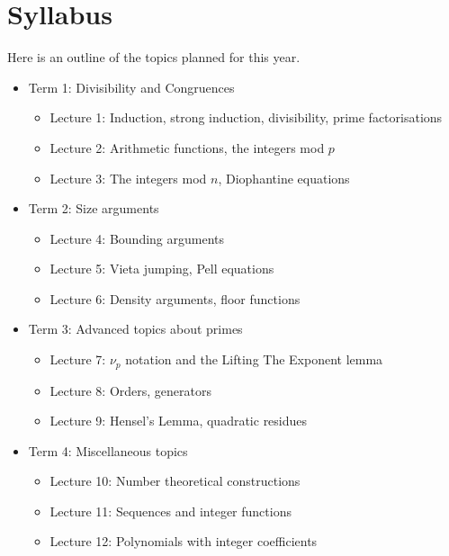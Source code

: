 \documentclass{article}
\begin{document}
\section{Syllabus}
Here is an outline of the topics planned for this year.
\begin{itemize}
  \item Term 1: Divisibility and Congruences
    \begin{itemize}
      \item Lecture 1: Induction, strong induction, divisibility, prime
        factorisations
      \item Lecture 2: Arithmetic functions, the integers mod $p$
      \item Lecture 3: The integers mod $n$, Diophantine equations
    \end{itemize}
  \item Term 2: Size arguments
    \begin{itemize}
      \item Lecture 4: Bounding arguments
      \item Lecture 5: Vieta jumping, Pell equations
      \item Lecture 6: Density arguments, floor functions
    \end{itemize}
  \item Term 3: Advanced topics about primes
    \begin{itemize}
      \item Lecture 7: $\nu_p$ notation and the Lifting The Exponent lemma
      \item Lecture 8: Orders, generators
      \item Lecture 9: Hensel's Lemma, quadratic residues
    \end{itemize}
  \item Term 4: Miscellaneous topics
    \begin{itemize}
      \item Lecture 10: Number theoretical constructions
      \item Lecture 11: Sequences and integer functions
      \item Lecture 12: Polynomials with integer coefficients
    \end{itemize}
\end{itemize}
\end{document}
